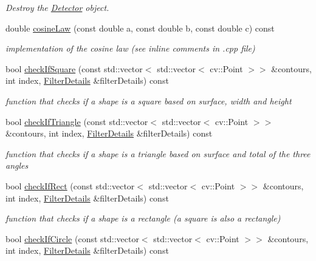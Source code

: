 \begin{DoxyCompactItemize}
\begin{DoxyCompactList}\small\item\em Destroy the \hyperlink{classDetector}{Detector} object. \end{DoxyCompactList}\item 
double \hyperlink{classDetector_a8357eef6f384fe126ebf511e21f592f4}{cosine\+Law} (const double a, const double b, const double c) const 
\begin{DoxyCompactList}\small\item\em implementation of the cosine law (see inline comments in .cpp file) \end{DoxyCompactList}\item 
bool \hyperlink{classDetector_a646cf1117d58014c700b18fe21318d1b}{check\+If\+Square} (const std\+::vector$<$ std\+::vector$<$ cv\+::\+Point $>$$>$ \&contours, int index, \hyperlink{structFilterDetails}{Filter\+Details} \&filter\+Details) const 
\begin{DoxyCompactList}\small\item\em function that checks if a shape is a square based on surface, width and height \end{DoxyCompactList}\item 
bool \hyperlink{classDetector_a11701ce9ed01a8cbc0e12e3f7d30fc59}{check\+If\+Triangle} (const std\+::vector$<$ std\+::vector$<$ cv\+::\+Point $>$$>$ \&contours, int index, \hyperlink{structFilterDetails}{Filter\+Details} \&filter\+Details) const 
\begin{DoxyCompactList}\small\item\em function that checks if a shape is a triangle based on surface and total of the three angles \end{DoxyCompactList}\item 
bool \hyperlink{classDetector_a04bb1c8b13c2902e322bdb5533dc24d4}{check\+If\+Rect} (const std\+::vector$<$ std\+::vector$<$ cv\+::\+Point $>$$>$ \&contours, int index, \hyperlink{structFilterDetails}{Filter\+Details} \&filter\+Details) const 
\begin{DoxyCompactList}\small\item\em function that checks if a shape is a rectangle (a square is also a rectangle) \end{DoxyCompactList}\item 
bool \hyperlink{classDetector_a93e674f8779b04318ec20e14b9f29fa3}{check\+If\+Circle} (const std\+::vector$<$ std\+::vector$<$ cv\+::\+Point $>$$>$ \&contours, int index, \hyperlink{structFilterDetails}{Filter\+Details} \&filter\+Details) const 

\end{DoxyCompactItemize}
